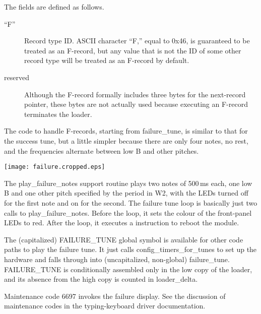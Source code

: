
The fields are defined as follows.

\begin{description}
  \item[``F''] Record type ID.  ASCII character ``F,'' equal to 0x46, is
    guaranteed to be treated as an F-record, but any value that is not the
    ID of some other record type will be treated as an F-record by default.
  \item[reserved]  Although the F-record formally includes three bytes for
    the next-record pointer, these bytes are not actually used because
    executing an F-record terminates the loader.
\end{description}

The code to handle F-records, starting from failure\_tune, is similar to
that for the success tune, but a little simpler because there are only four
notes, no rest, and the frequencies alternate between low B and other
pitches.

\texttt{[image: failure.cropped.eps]}

The play\_failure\_notes support routine plays two notes of 500\,ms each,
one low B and one other pitch specified by the period in W2, with the LEDs
turned off for the first note and on for the second.  The failure tune loop
is basically just two calls to play\_failure\_notes.  Before the loop, it
sets the colour of the front-panel LEDs to red.  After the loop, it executes
a  instruction to reboot the module.

The (capitalized) FAILURE\_TUNE global symbol is available for other code
paths to play the failure tune.  It just calls config\_timers\_for\_tunes to
set up the hardware and falls through into (uncapitalized, non-global)
failure\_tune.  FAILURE\_TUNE is conditionally assembled only in the low
copy of the loader, and its absence from the high copy is counted in
loader\_delta.

Maintenance code 6697 invokes the failure display.  See the discussion of
maintenance codes in the typing-keyboard driver documentation.

